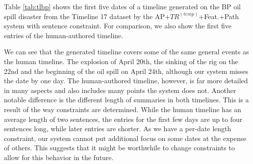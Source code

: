 \documentclass[a4paper,BCOR=10mm]{report}
\numberwithin{lemma}{chapter}
\numberwithin{definition}{chapter}
\begin{document}

Table \ref{tab:tlbp} shows the first five dates of a timeline generated on the BP oil spill disaster from the Timeline 17 dataset by the AP+$TR^{(temp)}$+Feat.+Path system with sentence constraint.
For comparison, we also show the first five entries of the human-authored timeline.

We can see that the generated timeline covers some of the same general events as the human timeline.
The explosion of April 20th, the sinking of the rig on the 22nd and the beginning of the oil spill on April 24th, although our system misses the date by one day. The human-authored timeline, however, is far more detailed in many aspects and also includes many points the system does not.
Another notable difference is the different length of summaries in both timelines. This is a result of the way constraints are determined. While the human timeline has an average length of two sentences, the entries for the first few days are up to four sentences long, while later entries are shorter.
As we have a per-date length constraint, our system cannot put additional focus on some dates at the expense of others. This suggests that it might be worthwhile to change constraints to allow for this behavior in the future.
\end{document}
